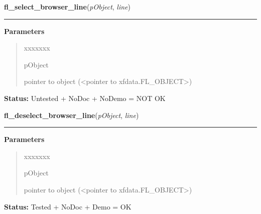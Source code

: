 \hspace{.8\funcindent}\begin{boxedminipage}{\funcwidth}

    \raggedright \textbf{fl\_select\_browser\_line}(\textit{pObject}, \textit{line})

    \vspace{-1.5ex}

    \rule{\textwidth}{0.5\fboxrule}
\setlength{\parskip}{2ex}
\setlength{\parskip}{1ex}
      \textbf{Parameters}
      \vspace{-1ex}

      \begin{quote}
        \begin{Ventry}{xxxxxxx}

          \item[pObject]

          pointer to object ({\textless}pointer to 
          xfdata.FL\_OBJECT{\textgreater})

        \end{Ventry}

      \end{quote}

\textbf{Status:} Untested + NoDoc + NoDemo = NOT OK



    \end{boxedminipage}

    \label{xformslib:library:fl_deselect_browser_line}

    \vspace{0.5ex}

\hspace{.8\funcindent}\begin{boxedminipage}{\funcwidth}

    \raggedright \textbf{fl\_deselect\_browser\_line}(\textit{pObject}, \textit{line})

    \vspace{-1.5ex}

    \rule{\textwidth}{0.5\fboxrule}
\setlength{\parskip}{2ex}
\setlength{\parskip}{1ex}
      \textbf{Parameters}
      \vspace{-1ex}

      \begin{quote}
        \begin{Ventry}{xxxxxxx}

          \item[pObject]

          pointer to object ({\textless}pointer to 
          xfdata.FL\_OBJECT{\textgreater})

        \end{Ventry}

      \end{quote}

\textbf{Status:} Tested + NoDoc + Demo = OK



    \end{boxedminipage}

